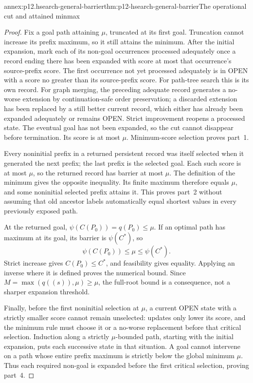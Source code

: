 \begin{annexitem}{annex:p12.hsearch-general-barrier}{thm:p12-hsearch-general-barrier}{The operational cut and attained minmax}
\begin{proof}
Fix a goal path attaining \(\mu\), truncated at its first goal.
Truncation cannot increase its prefix maximum, so it still attains the
minimum. After the initial expansion, mark each of its non-goal
occurrences processed adequately once a record ending there has been
expanded with score at most that occurrence's source-prefix score.
The first occurrence not yet processed adequately is in OPEN with a
score no greater than its source-prefix score. For path-tree search this
is its own record. For graph merging, the preceding adequate record
generates a no-worse extension by continuation-safe order preservation;
a discarded extension has been replaced by a still better current
record, which either has already been expanded adequately or remains
OPEN. Strict improvement reopens a processed state. The eventual goal
has not been expanded, so the cut cannot disappear before termination.
Its score is at most \(\mu\). Minimum-score selection proves part~1.

Every noninitial prefix in a returned persistent record was itself
selected when it generated the next prefix; the last prefix is the
selected goal. Each such score is at most \(\mu\), so the returned
record has barrier at most \(\mu\). The definition of the minimum
gives the opposite inequality. Its finite maximum therefore equals
\(\mu\), and some noninitial selected prefix attains it. This proves
part~2 without assuming that old ancestor labels automatically equal
shortest values in every previously exposed path.

At the returned goal, \(\psi(C(P_0))=q(P_0)\le\mu\).
If an optimal path has maximum at its goal, its barrier is
\(\psi(C^*)\), so
\[
 \psi(C(P_0))\le\mu\le\psi(C^*).
\]
Strict increase gives \(C(P_0)\le C^*\), and feasibility gives
equality. Applying an inverse where it is defined proves the numerical
bound. Since \(M=\max(q((s)),\mu)\ge\mu\), the full-root bound
is a consequence, not a sharper expansion threshold.

Finally, before the first noninitial selection at \(\mu\), a current
OPEN state with a strictly smaller score cannot remain unselected:
updates only lower its score, and the minimum rule must choose it or a
no-worse replacement before that critical selection. Induction along a
strictly \(\mu\)-bounded path, starting with the initial expansion,
puts each successive state in that situation. A goal cannot intervene
on a path whose entire prefix maximum is strictly below the global
minimum \(\mu\). Thus each required non-goal is expanded before
the first critical selection, proving part~4.
\end{proof}
\end{annexitem}

